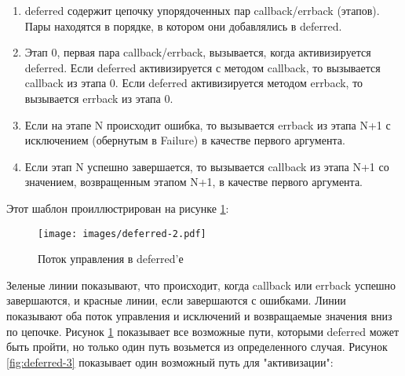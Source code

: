 \begin{enumerate}

\item deferred содержит цепочку упорядоченных пар callback/errback (этапов). 
Пары находятся в порядке, в котором они добавлялись в deferred.

\item Этап 0, первая пара callback/errback, вызывается, когда 
активизируется deferred. Если deferred активизируется с методом 
callback, то вызывается callback из этапа 0. Если deferred 
активизируется методом errback, то вызывается errback из этапа 0. 

\item Если на этапе N происходит ошибка, то 
вызывается errback из этапа N+1 с исключением (обернутым в Failure) в 
качестве первого аргумента.

\item Если этап N успешно завершается, то вызывается callback из 
этапа N+1 со значением, возвращенным этапом N+1, в качестве первого аргумента.

\end{enumerate}


Этот шаблон проиллюстрирован на рисунке \ref{fig:deferred-2}:

\begin{figure}[h]
\begin{center}
    \texttt{[image: images/deferred-2.pdf]}
    \caption{Поток управления в deferred'е\label{fig:deferred-2}}
\end{center}
\end{figure}


Зеленые линии показывают, что происходит, когда 
callback или errback успешно завершаются, и 
красные линии, если завершаются с ошибками. 
Линии показывают оба поток управления и исключений и 
возвращаемые значения вниз по цепочке. Рисунок \ref{fig:deferred-2} 
показывает все возможные пути, которыми deferred 
может быть пройти, но только один путь возьмется из определенного 
случая. Рисунок \ref{fig:deferred-3} показывает один 
возможный путь для "активизации": 

